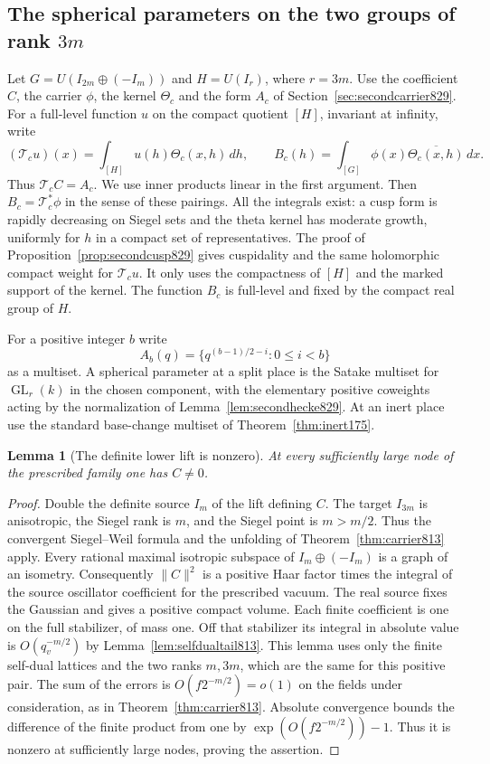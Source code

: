 \documentclass[a4paper,11pt]{article}
\newtheorem{lemma}[proposition]{Lemma}
\theoremstyle{definition}
\theoremstyle{remark}
\numberwithin{equation}{section}
\begin{document}
\subsection{The spherical parameters on the two groups of rank \(3m\)}
\label{sec:carrierspectra830}
Let \(G=U(I_{2m}\oplus(-I_m))\) and \(H=U(I_r)\), where
\(r=3m\). Use the coefficient \(C\), the carrier \(\phi\),
the kernel \(\Theta_c\) and the form \(A_c\) of
Section~\ref{sec:secondcarrier829}. For a full-level function
\(u\) on the compact quotient \([H]\), invariant at infinity,
write
\[
 (\mathcal T_c u)(x)=\int_{[H]}u(h)\Theta_c(x,h)\,dh,\qquad
 B_c(h)=\int_{[G]}\phi(x)\overline{\Theta_c(x,h)}\,dx .
\]
Thus \(\mathcal T_c C=A_c\). We use inner products linear
in the first argument. Then \(B_c=\mathcal T_c^*\phi\) in
the sense of these pairings. All the integrals exist:
a cusp form is rapidly decreasing on Siegel sets and the
theta kernel has moderate growth, uniformly for \(h\) in a
compact set of representatives. The proof of
Proposition~\ref{prop:secondcusp829} gives cuspidality and
the same holomorphic compact weight for \(\mathcal T_c u\).
It only uses the compactness of \([H]\) and the marked support
of the kernel. The function \(B_c\) is full-level and fixed
by the compact real group of \(H\).

For a positive integer \(b\) write
\[
             A_b(q)=\{q^{(b-1)/2-i}:0\le i<b\}
\]
as a multiset. A spherical parameter at a split place is
the Satake multiset for \(\operatorname{GL}_r(k)\) in the
chosen component, with the elementary positive coweights
acting by the normalization of Lemma~\ref{lem:secondhecke829}.
At an inert place use the standard base-change multiset
of Theorem~\ref{thm:inert175}.

\begin{lemma}[The definite lower lift is nonzero]
\leavevmode\label{lem:nonzerodefinite830}
At every sufficiently large node of the prescribed family one
has \(C\ne0\).
\end{lemma}
\begin{proof}
Double the definite source \(I_m\) of the lift defining \(C\).
The target \(I_{3m}\) is anisotropic, the Siegel rank is \(m\),
and the Siegel point is \(m>m/2\). Thus the convergent
Siegel--Weil formula and the unfolding of
Theorem~\ref{thm:carrier813} apply. Every rational maximal
isotropic subspace of \(I_m\oplus(-I_m)\) is a graph of an
isometry. Consequently \(\|C\|^2\) is a positive Haar factor
times the integral of the source oscillator coefficient for
the prescribed vacuum. The real source fixes the Gaussian
and gives a positive compact volume. Each finite coefficient
is one on the full stabilizer, of mass one. Off that
stabilizer its integral in absolute value is \(O(q_v^{-m/2})\)
by Lemma~\ref{lem:selfdualtail813}. This lemma uses only the
finite self-dual lattices and the two ranks \(m,3m\), which
are the same for this positive pair. The sum of the errors
is \(O(f2^{-m/2})=o(1)\) on the fields under consideration,
as in Theorem~\ref{thm:carrier813}. Absolute convergence
bounds the difference of the finite product from one by
\(\exp(O(f2^{-m/2}))-1\). Thus it is nonzero at sufficiently
large nodes, proving the assertion.
\end{proof}
\end{document}
